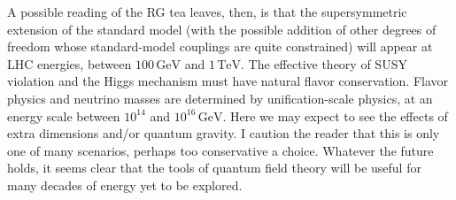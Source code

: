 A possible reading of the RG tea leaves, then, is that the supersymmetric
extension of the standard model (with the possible addition of other degrees
of freedom whose standard-model couplings are quite constrained) will appear
at LHC energies, between $100\,\mathrm{GeV}$ and $1\,\mathrm{TeV}$. The effective
theory of SUSY violation and the Higgs mechanism must have natural flavor
conservation. Flavor physics and neutrino masses are determined by
unification-scale physics, at an energy scale between $10^{14}$ and
$10^{16}\,\mathrm{GeV}$. Here we may expect to see the effects of extra
dimensions and/or quantum gravity. I caution the reader that this is only one
of many scenarios, perhaps too conservative a choice. Whatever the future
holds, it seems clear that the tools of quantum field theory will be useful for
many decades of energy yet to be explored.
